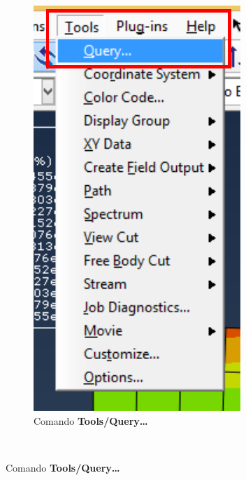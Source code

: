 \begin{enumerate}
\begin{figure}[H]
\begin{subfigure}{0.29\textwidth}
     \includegraphics[width=\textwidth]{./body/images/imagen88.pdf}
     \caption{Comando \textbf{Tools/Query\ldots}}
     \label{figu88}
   \end{subfigure}%
   ~ %

\end{figure}
\end{enumerate}
